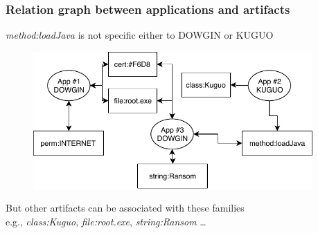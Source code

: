 \begin{frame}
    \frametitle{Relation graph between applications and artifacts}
    \centering

    \textit{method:loadJava} is not specific either to DOWGIN or KUGUO \\

    \begin{figure}[!ht]
        \includegraphics[width=0.95\textwidth]{figures/apgraph/structure.pdf}
    \end{figure}

    But other artifacts can be associated with these families \\
    \smallskip{}
    e.g., \textit{class:Kuguo}, \textit{file:root.exe}, \textit{string:Ransom} \ldots

\end{frame}



